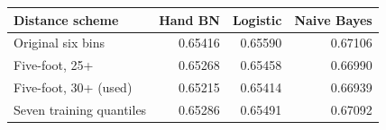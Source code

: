 \begin{tabular}{lrrr}
\toprule
Distance scheme & Hand BN & Logistic & Naive Bayes\\
\midrule
Original six bins & 0.65416 & 0.65590 & 0.67106\\
Five-foot, 25+ & 0.65268 & 0.65458 & 0.66990\\
Five-foot, 30+ (used) & 0.65215 & 0.65414 & 0.66939\\
Seven training quantiles & 0.65286 & 0.65491 & 0.67092\\
\bottomrule
\end{tabular}
